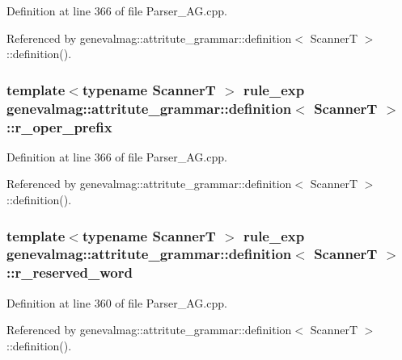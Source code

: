Definition at line 366 of file Parser\_\-AG.cpp.



Referenced by genevalmag::attritute\_\-grammar::definition$<$ ScannerT $>$::definition().

\hypertarget{structgenevalmag_1_1attritute__grammar_1_1definition_a8a68baac35400858a4adb56164b2c17e}{
\subsubsection[{r\_\-oper\_\-prefix}]{\setlength{\rightskip}{0pt plus 5cm}template$<$typename ScannerT $>$ {\bf rule\_\-exp} {\bf genevalmag::attritute\_\-grammar::definition}$<$ ScannerT $>$::{\bf r\_\-oper\_\-prefix}}}
\label{structgenevalmag_1_1attritute__grammar_1_1definition_a8a68baac35400858a4adb56164b2c17e}


Definition at line 366 of file Parser\_\-AG.cpp.



Referenced by genevalmag::attritute\_\-grammar::definition$<$ ScannerT $>$::definition().

\hypertarget{structgenevalmag_1_1attritute__grammar_1_1definition_a31577dcb0d025bbcdf18f743f2b0dc12}{
\subsubsection[{r\_\-reserved\_\-word}]{\setlength{\rightskip}{0pt plus 5cm}template$<$typename ScannerT $>$ {\bf rule\_\-exp} {\bf genevalmag::attritute\_\-grammar::definition}$<$ ScannerT $>$::{\bf r\_\-reserved\_\-word}}}
\label{structgenevalmag_1_1attritute__grammar_1_1definition_a31577dcb0d025bbcdf18f743f2b0dc12}


Definition at line 360 of file Parser\_\-AG.cpp.



Referenced by genevalmag::attritute\_\-grammar::definition$<$ ScannerT $>$::definition().


